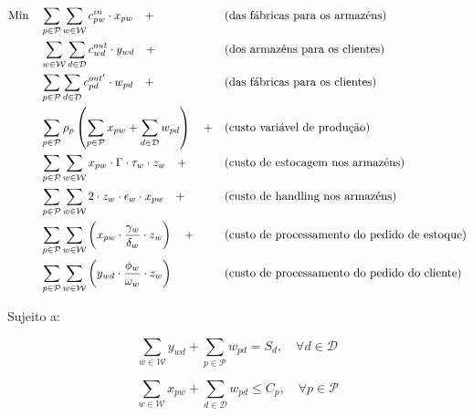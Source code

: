 \documentclass[12pt,a4paper]{article}
\begin{document}
\begin{align}
    \text{Min} \quad
    & \sum_{p \in \mathcal{P}} \sum_{w \in \mathcal{W}} c^{in}_{pw} \cdot x_{pw} \quad +
    && \text{(das fábricas para os armazéns)} \notag \\
    & \sum_{w \in \mathcal{W}} \sum_{d \in \mathcal{D}} c^{out}_{wd} \cdot y_{wd} \quad +
    && \text{(dos armazéns para os clientes)} \notag \\
    & \sum_{p \in \mathcal{P}} \sum_{d \in \mathcal{D}} c^{out'}_{pd} \cdot w_{pd} \quad +
    && \text{(das fábricas para os clientes)} \notag \\
    & \sum_{p \in \mathcal{P}} \rho_{p} \left(
        \sum_{p \in \mathcal{P}} x_{pw} + \sum_{d \in \mathcal{D}} w_{pd}
    \right) \quad +
    && \text{(custo variável de produção)} \notag \\
    & \sum_{p \in \mathcal{P}} \sum_{w \in \mathcal{W}} x_{pw} \cdot \Gamma \cdot \tau_{w} \cdot z_{w} \quad +
    && \text{(custo de estocagem nos armazéns)} \notag \\
    & \sum_{p \in \mathcal{P}} \sum_{w \in \mathcal{W}} 2 \cdot z_{w} \cdot \epsilon_{w} \cdot x_{pw} \quad +
    && \text{(custo de handling nos armazéns)} \notag \\
    & \sum_{p \in \mathcal{P}} \sum_{w \in \mathcal{W}} \left(
        x_{pw} \cdot \frac{\gamma_{w}}{\delta_{w}} \cdot z_{w}
        \right) \quad +
    && \text{(custo de processamento do pedido de estoque)} \notag \\
    & \sum_{p \in \mathcal{P}} \sum_{w \in \mathcal{W}} \left(
        y_{wd} \cdot \frac{\phi_{w}}{\omega_{w}} \cdot z_{w}
        \right)
    && \text{(custo de processamento do pedido do cliente)} \notag \\
\end{align}

Sujeito a: %

\begin{equation} %
    \sum_{w \in \mathcal{W}} y_{wd} +
    \sum_{p \in \mathcal{P}} w_{pd} =
    S_d, \quad
    \forall d \in \mathcal{D}
\end{equation}


\begin{equation} %
    \sum_{w \in \mathcal{W}} x_{pw} +
    \sum_{d \in \mathcal{D}} w_{pd}
    \leq C_p, \quad
    \forall p \in \mathcal{P}
\end{equation}
\end{document}
